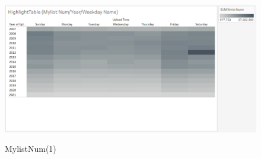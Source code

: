 \documentclass[submit,techrep,noauthor]{ipsj}
\begin{document}
\begin{figure}[h]
\begin{minipage}[b]{0.49\columnwidth}
    \label{fig:highlighttable_mylistnum_yearmonth}
  \end{minipage}
  \begin{minipage}[b]{0.49\columnwidth}
    \centering
    \includegraphics[width=\columnwidth]{./eps/HighlightTable_MylistNum_YearWeekdayName.eps}
    \label{fig:highlighttable_mylistnum_yearweekdayname}
  \end{minipage}
  \vspace{-1.0zh}
  \caption{MylistNum(1)}
  \vspace{-1.0zh}
    \label{fig:highlighttable_mylist_year}
\end{figure}
%
\vspace{-2.5zh}
%
\end{document}
